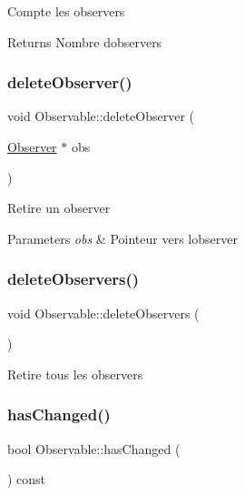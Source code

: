 Compte les observers

\begin{DoxyReturn}{Returns}
Nombre d\textquotesingle{}observers 
\end{DoxyReturn}
\mbox{\label{classObservable_abf78cf600c4ee7f53d3f304a45a99997}} 
\subsubsection{\texorpdfstring{delete\+Observer()}{deleteObserver()}}
{\footnotesize\ttfamily void Observable\+::delete\+Observer (\begin{DoxyParamCaption}\item[{\hyperlink{classObserver}{Observer} $\ast$}]{obs }\end{DoxyParamCaption})}

Retire un observer


\begin{DoxyParams}{Parameters}
{\em obs} & Pointeur vers l\textquotesingle{}observer \\
\hline
\end{DoxyParams}
\mbox{\label{classObservable_a58d44b0ffda7a756d543f819028a65ed}} 
\subsubsection{\texorpdfstring{delete\+Observers()}{deleteObservers()}}
{\footnotesize\ttfamily void Observable\+::delete\+Observers (\begin{DoxyParamCaption}{ }\end{DoxyParamCaption})}

Retire tous les observers \mbox{\label{classObservable_a47d67f961b4668f8cb69e6017d5534c1}} 
\subsubsection{\texorpdfstring{has\+Changed()}{hasChanged()}}
{\footnotesize\ttfamily bool Observable\+::has\+Changed (\begin{DoxyParamCaption}{ }\end{DoxyParamCaption}) const}


